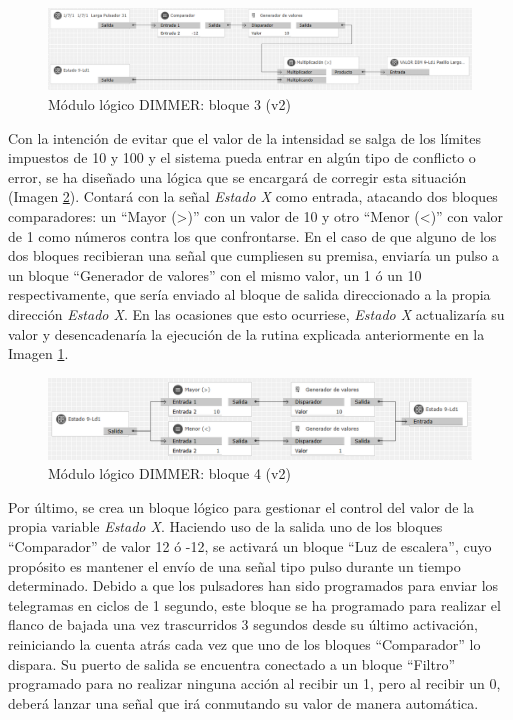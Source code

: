 \begin{figure}[H]
\includegraphics[width=1.15\textwidth]{figures/log_dimm_b23.png}  
\caption{Módulo lógico DIMMER: bloque 3 (v2)}
\label{fig:log_dimm_b23}
\end{figure}

Con la intención de evitar que el valor de la intensidad se salga de los límites impuestos de 10 y 100 y el sistema pueda entrar en algún tipo de conflicto o error, se ha diseñado una lógica que se encargará de corregir esta situación (Imagen \ref{fig:log_dimm_b24}). Contará con la señal \textit{Estado X} como entrada, atacando dos bloques comparadores: un “Mayor (>)” con un valor de 10 y otro “Menor (<)” con valor de 1 como números contra los que confrontarse. En el caso de que alguno de los dos bloques recibieran una señal que cumpliesen su premisa, enviaría un pulso a un bloque “Generador de valores” con el mismo valor, un 1 ó un 10 respectivamente, que sería enviado al bloque de salida direccionado a la propia dirección \textit{Estado X}. En las ocasiones que esto ocurriese, \textit{Estado X} actualizaría su valor y desencadenaría la ejecución de la rutina explicada anteriormente en la Imagen \ref{fig:log_dimm_b23}.

\begin{figure}[H]
\includegraphics[width=1.15\textwidth]{figures/log_dimm_b24.png}  
\caption{Módulo lógico DIMMER: bloque 4 (v2)}
\label{fig:log_dimm_b24}
\end{figure}

Por último, se crea un bloque lógico para gestionar el control del valor de la propia variable \textit{Estado X}. Haciendo uso de la salida uno de los bloques “Comparador” de valor 12 ó -12, se activará un bloque “Luz de escalera”, cuyo propósito es mantener el envío de una señal tipo pulso durante un tiempo determinado. Debido a que los pulsadores han sido programados para enviar los telegramas en ciclos de 1 segundo, este bloque se ha programado para realizar el flanco de bajada una vez trascurridos 3 segundos desde su último activación, reiniciando la cuenta atrás cada vez que uno de los bloques “Comparador” lo dispara. Su puerto de salida se encuentra conectado a un bloque “Filtro” programado para no realizar ninguna acción al recibir un 1, pero al recibir un 0, deberá lanzar una señal que irá conmutando su valor de manera automática.  

